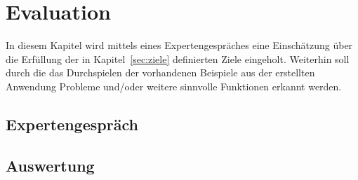 \chapter{Evaluation}\label{ch:evaluation}
In diesem Kapitel wird mittels eines Expertengespräches eine Einschätzung über die Erfüllung der in
Kapitel~\ref{sec:ziele} definierten Ziele eingeholt.
Weiterhin soll durch die das Durchspielen der vorhandenen Beispiele aus der erstellten Anwendung Probleme und/oder weitere sinnvolle
Funktionen erkannt werden.

\section{Expertengespräch}\label{sec:expertengespraech}

\section{Auswertung}\label{sec:auswertung}
